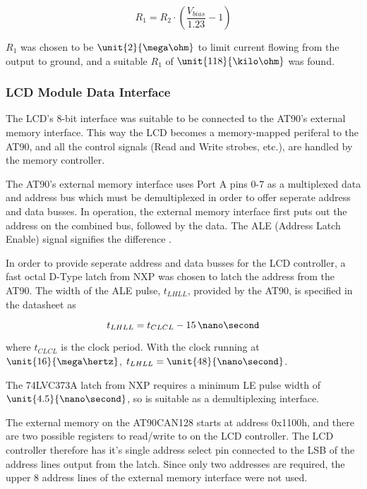 \begin{equation}
R_{1}=R_{2}\cdot\left(\frac{V_{bias}}{1.23}-1\right)
\end{equation}

 $R_{1}$ was chosen to be $\unit{2}{\mega\ohm}$ to limit current flowing from the output to ground, and a suitable $R_{1}$ of $\unit{118}{\kilo\ohm}$ was found.


\subsubsection{LCD Module Data Interface\label{sec:lcd_module_data_interface}}

The LCD's 8-bit interface was suitable to be connected to the AT90's external memory interface. This way the LCD becomes a memory-mapped periferal to the AT90, and all the control signals (Read and Write strobes, etc.), are handled by the memory controller.

The AT90's external memory interface uses Port A pins 0-7 as a multiplexed data and address bus which must be demultiplexed in order to offer seperate address and data busses. In operation, the external memory interface first puts out the address on the combined bus, followed by the data. The ALE (Address Latch Enable) signal signifies the difference \cite{AT90CAN}.

In order to provide seperate address and data busses for the LCD controller, a fast octal D-Type latch from NXP was chosen to latch the address from the AT90. The width of the ALE pulse, $t_{LHLL}$, provided by the AT90, is specified in the datasheet as

\begin{equation}
t_{LHLL}=t_{CLCL}-15\, \nano\second
\end{equation}

 where $t_{CLCL}$ is the clock period. With the clock running at $\unit{16}{\mega\hertz}$, $t_{LHLL}=\unit{48}{\nano\second}$.

The 74LVC373A latch from NXP requires a minimum LE pulse width of $\unit{4.5}{\nano\second}$, so is suitable as a demultiplexing interface.

The external memory on the AT90CAN128 starts at address 0x1100h, and there are two possible registers to read/write to on the LCD controller. The LCD controller therefore has it's single address select pin connected to the LSB of the address lines output from the latch. Since only two addresses are required, the upper 8 address lines of the external memory interface were not used.

